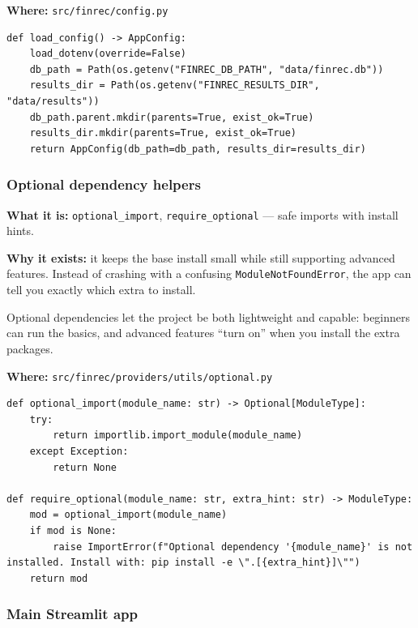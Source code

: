 \documentclass[11pt,a4paper]{article}
\begin{document}
\textbf{Where:} \texttt{src/finrec/config.py}

\begin{lstlisting}
def load_config() -> AppConfig:
    load_dotenv(override=False)
    db_path = Path(os.getenv("FINREC_DB_PATH", "data/finrec.db"))
    results_dir = Path(os.getenv("FINREC_RESULTS_DIR", "data/results"))
    db_path.parent.mkdir(parents=True, exist_ok=True)
    results_dir.mkdir(parents=True, exist_ok=True)
    return AppConfig(db_path=db_path, results_dir=results_dir)
\end{lstlisting}

\subsubsection{Optional dependency helpers}\label{sec:optional}

\textbf{What it is:} \texttt{optional\_import}, \texttt{require\_optional} --- safe imports with install hints.

\textbf{Why it exists:} it keeps the base install small while still supporting advanced features. Instead of crashing with a confusing \texttt{ModuleNotFoundError}, the app can tell you exactly which extra to install.

\begin{intuitionbox}
Optional dependencies let the project be both lightweight and capable: beginners can run the basics, and advanced features ``turn on'' when you install the extra packages.
\end{intuitionbox}

\textbf{Where:} \texttt{src/finrec/providers/utils/optional.py}

\begin{lstlisting}
def optional_import(module_name: str) -> Optional[ModuleType]:
    try:
        return importlib.import_module(module_name)
    except Exception:
        return None

def require_optional(module_name: str, extra_hint: str) -> ModuleType:
    mod = optional_import(module_name)
    if mod is None:
        raise ImportError(f"Optional dependency '{module_name}' is not installed. Install with: pip install -e \".[{extra_hint}]\"")
    return mod
\end{lstlisting}

\subsubsection{Main Streamlit app}\label{sec:streamlit}
\end{document}
